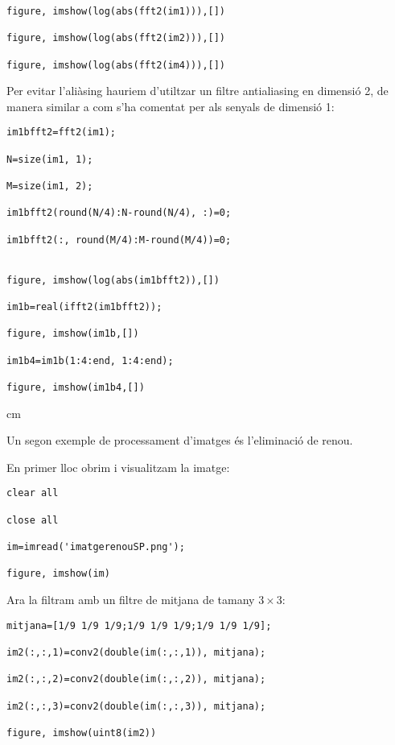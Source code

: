 \documentclass{article}
\begin{document}
\begin{verbatim}
figure, imshow(log(abs(fft2(im1))),[])

figure, imshow(log(abs(fft2(im2))),[])

figure, imshow(log(abs(fft2(im4))),[])

\end{verbatim}

Per evitar l'aliàsing hauriem d'utiltzar un filtre antialiasing en dimensió 2, de manera similar a com s'ha comentat per
als senyals de dimensió 1:

\begin{verbatim}
im1bfft2=fft2(im1);

N=size(im1, 1);

M=size(im1, 2);

im1bfft2(round(N/4):N-round(N/4), :)=0;

im1bfft2(:, round(M/4):M-round(M/4))=0;


figure, imshow(log(abs(im1bfft2)),[])

im1b=real(ifft2(im1bfft2));

figure, imshow(im1b,[])

im1b4=im1b(1:4:end, 1:4:end);

figure, imshow(im1b4,[])
\end{verbatim}


 cm

Un segon exemple de processament d'imatges és l'eliminació de renou.

En primer lloc obrim i visualitzam la imatge:

\begin{verbatim}
clear all

close all

im=imread('imatgerenouSP.png');

figure, imshow(im)
\end{verbatim}


Ara la filtram amb un filtre de mitjana de tamany $3 \times 3$:

\begin{verbatim}
mitjana=[1/9 1/9 1/9;1/9 1/9 1/9;1/9 1/9 1/9];

im2(:,:,1)=conv2(double(im(:,:,1)), mitjana);

im2(:,:,2)=conv2(double(im(:,:,2)), mitjana);

im2(:,:,3)=conv2(double(im(:,:,3)), mitjana);

figure, imshow(uint8(im2))
\end{verbatim}
\end{document}
